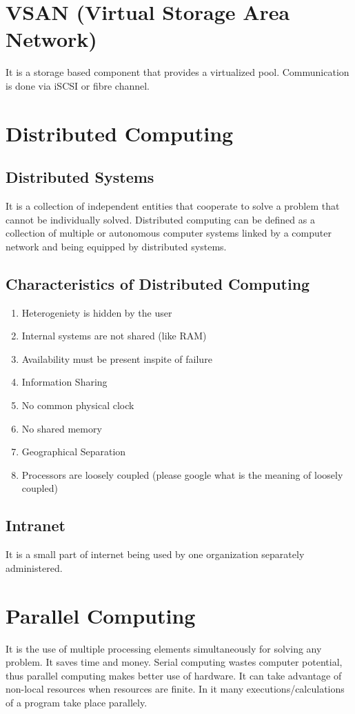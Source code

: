 \documentclass{article}
\begin{document}
\section*{VSAN (Virtual Storage Area Network)}
It is a storage based component that provides a virtualized pool. Communication is done via iSCSI or fibre channel.
\section*{Distributed Computing}
\subsection*{Distributed Systems}
It is a collection of independent entities that cooperate to solve a problem that cannot be individually solved. Distributed computing can be defined as a collection of multiple or autonomous computer systems linked by a computer network and being equipped by distributed systems.
\subsection*{Characteristics of Distributed Computing}
\begin{enumerate}
    \item Heterogeniety is hidden by the user
    \item Internal systems are not shared (like RAM)
    \item Availability must be present inspite of failure
    \item Information Sharing
    \item No common physical clock
    \item No shared memory
    \item Geographical Separation
    \item Processors are loosely coupled (please google what is the meaning of loosely coupled)
\end{enumerate} 
\subsection*{Intranet}
It is a small part of internet being used by one organization separately administered.
\section*{Parallel Computing}
It is the use of multiple processing elements simultaneously for solving any problem. It saves time and money. Serial computing wastes computer potential, thus parallel computing makes better use of hardware. It can take advantage of non-local resources when resources are finite. In it many executions/calculations of a program take place parallely.
\end{document}
